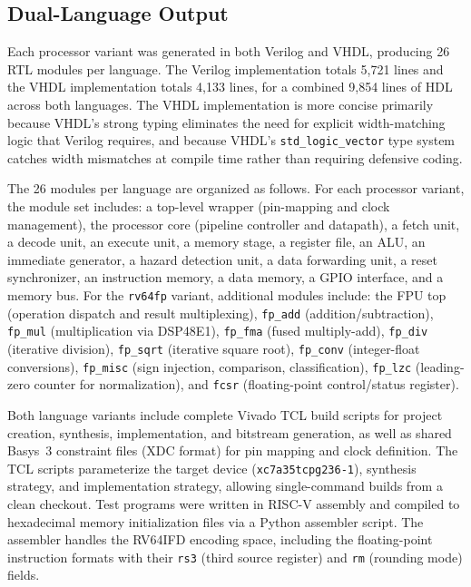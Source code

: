 \documentclass[journal]{IEEEtran}
\begin{document}
\subsection{Dual-Language Output}
\label{sec:dual}

Each processor variant was generated in both Verilog and VHDL, producing
26 RTL modules per language.  The Verilog implementation totals 5,721
lines and the VHDL implementation totals 4,133 lines, for a combined
9,854 lines of HDL across both languages.  The VHDL implementation is
more concise primarily because VHDL's strong typing eliminates the need
for explicit width-matching logic that Verilog requires, and because
VHDL's \texttt{std\_logic\_vector} type system catches width mismatches at
compile time rather than requiring defensive coding.

The 26 modules per language are organized as follows.  For each
processor variant, the module set includes: a top-level wrapper
(pin-mapping and clock management), the processor core (pipeline
controller and datapath), a fetch unit, a decode unit, an execute unit,
a memory stage, a register file, an ALU, an immediate generator, a
hazard detection unit, a data forwarding unit, a reset synchronizer, an
instruction memory, a data memory, a GPIO interface, and a memory bus.
For the \texttt{rv64fp} variant, additional modules include: the FPU top
(operation dispatch and result multiplexing), \texttt{fp\_add}
(addition/subtraction), \texttt{fp\_mul} (multiplication via DSP48E1),
\texttt{fp\_fma} (fused multiply-add), \texttt{fp\_div} (iterative
division), \texttt{fp\_sqrt} (iterative square root), \texttt{fp\_conv}
(integer-float conversions), \texttt{fp\_misc} (sign injection,
comparison, classification), \texttt{fp\_lzc} (leading-zero counter for
normalization), and \texttt{fcsr} (floating-point control/status
register).

Both language variants include complete Vivado TCL build scripts for
project creation, synthesis, implementation, and bitstream generation, as
well as shared Basys~3 constraint files (XDC format) for pin mapping and
clock definition.  The TCL scripts parameterize the target device
(\texttt{xc7a35tcpg236-1}), synthesis strategy, and implementation
strategy, allowing single-command builds from a clean checkout.
Test programs were written in RISC-V assembly and compiled
to hexadecimal memory initialization files via a Python assembler script.
The assembler handles the RV64IFD encoding space, including the
floating-point instruction formats with their \texttt{rs3} (third source
register) and \texttt{rm} (rounding mode) fields.
\end{document}
